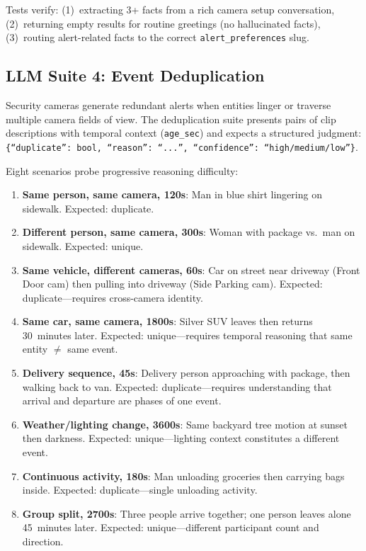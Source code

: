 \documentclass[conference]{IEEEtran}
\begin{document}
Tests verify: (1)~extracting 3+ facts from a rich camera setup
conversation, (2)~returning empty results for routine greetings
(no hallucinated facts), (3)~routing alert-related facts to the
correct \texttt{alert\_preferences} slug.

\subsection{LLM Suite 4: Event Deduplication}

Security cameras generate redundant alerts when entities linger or
traverse multiple camera fields of view. The deduplication suite
presents pairs of clip descriptions with temporal context (\texttt{age\_sec})
and expects a structured judgment:
\texttt{\{``duplicate'': bool, ``reason'': ``...'', ``confidence'': ``high/medium/low''\}}.

Eight scenarios probe progressive reasoning difficulty:

\begin{enumerate}[nosep]
    \item \textbf{Same person, same camera, 120s}: Man in blue shirt
    lingering on sidewalk. Expected: duplicate.
    \item \textbf{Different person, same camera, 300s}: Woman with package
    vs.\ man on sidewalk. Expected: unique.
    \item \textbf{Same vehicle, different cameras, 60s}: Car on street
    near driveway (Front Door cam) then pulling into driveway (Side
    Parking cam). Expected: duplicate---requires cross-camera identity.
    \item \textbf{Same car, same camera, 1800s}: Silver SUV leaves then
    returns 30~minutes later. Expected: unique---requires temporal
    reasoning that same entity $\neq$ same event.
    \item \textbf{Delivery sequence, 45s}: Delivery person approaching
    with package, then walking back to van. Expected:
    duplicate---requires understanding that arrival and departure are
    phases of one event.
    \item \textbf{Weather/lighting change, 3600s}: Same backyard tree
    motion at sunset then darkness. Expected: unique---lighting context
    constitutes a different event.
    \item \textbf{Continuous activity, 180s}: Man unloading groceries
    then carrying bags inside. Expected: duplicate---single
    unloading activity.
    \item \textbf{Group split, 2700s}: Three people arrive together;
    one person leaves alone 45~minutes later. Expected: unique---different
    participant count and direction.
\end{enumerate}
\end{document}
